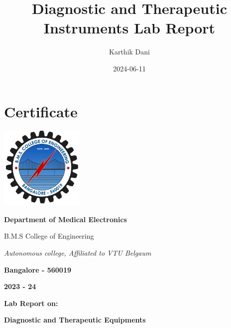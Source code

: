 \documentclass[
  11pt,
  letterpaper,
  DIV=11,
  numbers=noendperiod]{scrreprt}
\title{Diagnostic and Therapeutic Instruments Lab Report}
\author{Karthik Dani}
\date{2024-06-11}
\renewcommand*\contentsname{Table of contents}
\newcommand\contentsname{Table of contents}
\begin{document}
\maketitle

\renewcommand*\contentsname{Table of Contents}
{
\hypersetup{linkcolor=}
\setcounter{tocdepth}{1}
\tableofcontents
}

\chapter*{Certificate}\label{certificate}


\begin{center}
    \includegraphics[width=0.3\textwidth]{bmsce_logo.svg.png} %
\end{center}

\begin{center}
    \LARGE \textbf{Department of Medical Electronics}
\end{center}

\begin{center}
    \large B.M.S College of Engineering
\end{center}

\begin{center}
    \textit{Autonomous college, Affiliated to VTU Belgaum}
\end{center}

\begin{center}
    \textbf{Bangalore - 560019}
\end{center}

\begin{center}
    \textbf{2023 - 24}
\end{center}


\begin{center}
    \textbf{Lab Report on:}
\end{center}

\begin{center}
    \large \textbf{Diagnostic and Therapeutic Equipments}
\end{center}
\end{document}

